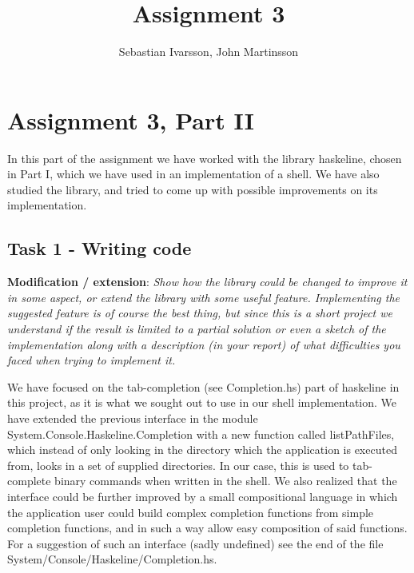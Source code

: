 \documentclass[11pt,a4paper]{article}
\begin{document}
\pagestyle{fancy}

\renewcommand{\headrulewidth}{0pt} \setlength{\headsep}{30pt}
\setlength{\headheight}{30pt}

\title{Assignment 3}
\author{Sebastian Ivarsson, John Martinsson}
\maketitle
\thispagestyle{fancy}


%


\section{Assignment 3, Part II}
In this part of the assignment we have worked with the library haskeline, chosen
in Part I, which we have used in an implementation of a shell. We have also
studied the library, and tried to come up with possible improvements on its
implementation.


\subsection{Task 1 - Writing code}

\textbf{Modification / extension}: \textit{Show how the library could be changed to improve it in
some aspect, or extend the library with some useful feature. Implementing the
suggested feature is of course the best thing, but since this is a short project
we understand if the result is limited to a partial solution or even a sketch of
the implementation along with a description (in your report) of what
difficulties you faced when trying to implement it.}

We have focused on the tab-completion (see Completion.hs) part of haskeline in
this project, as it is what we sought out to use in our shell implementation. We
have extended the previous interface in the module
System.Console.Haskeline.Completion with a new function called listPathFiles,
which instead of only looking in the directory which the application is executed
from, looks in a set of supplied directories. In our case, this is used to
tab-complete binary commands when written in the shell. We also realized that
the interface could be further improved by a small compositional language in
which the application user could build complex completion functions from simple
completion functions, and in such a way allow easy composition of said
functions. For a suggestion of such an interface (sadly undefined) see the end
of the file System/Console/Haskeline/Completion.hs.
\end{document}

